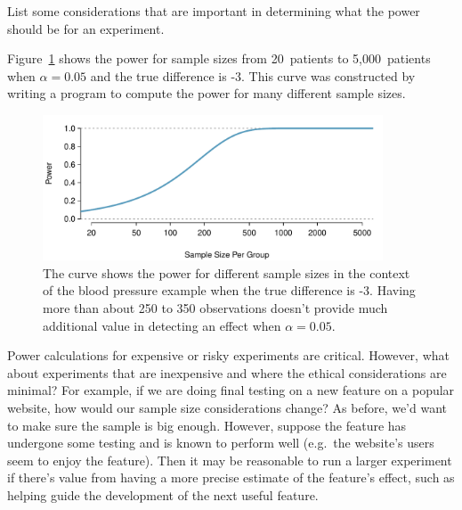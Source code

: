\begin{exercisewrap}
\begin{nexercise}
List some considerations that are important in determining what the power should be for an experiment.\footnotemark{}
\end{nexercise}
\end{exercisewrap}

Figure~\ref{power_curve_neg-3} shows the power for sample sizes from 20~patients to 5,000~patients when $\alpha = 0.05$ and the true difference is -3. This curve was constructed by writing a program to compute the power for many different sample sizes.

\begin{figure}[h]
\centering
\includegraphics[width=0.9\textwidth]{ch_inference_for_means/figures/power_curve/power_curve_neg-3}
\caption{The curve shows the power for different sample sizes in the context of the blood pressure example when the true difference is -3. Having more than about 250 to 350 observations doesn't provide much additional value in detecting an effect when $\alpha = 0.05$.}
\label{power_curve_neg-3}
\end{figure}

%

Power calculations for expensive or risky experiments are
critical.
However, what about experiments that are inexpensive and
where the ethical considerations are minimal?
For example, if we are doing final testing on a new feature
on a popular website, how would our sample size considerations
change?
As before, we'd want to make sure the sample is big enough.
However, suppose the feature has undergone some testing and
is known to perform well
(e.g.~the website's users seem to enjoy the feature).
Then it may be reasonable to run a larger experiment
if there's value from having a more precise estimate
of the feature's effect, such as helping guide the
development of the next useful feature.




